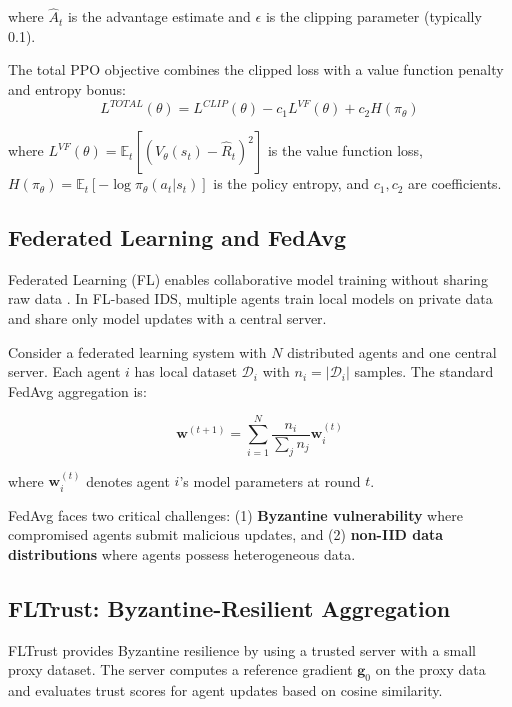 \documentclass[conference]{IEEEtran}
\begin{document}
where $\hat{A}_t$ is the advantage estimate and $\epsilon$ is the clipping parameter (typically 0.1).

The total PPO objective combines the clipped loss with a value function penalty and entropy bonus:
\begin{equation}
L^{TOTAL}(\theta) = L^{CLIP}(\theta) - c_1 L^{VF}(\theta) + c_2 H(\pi_\theta)
\end{equation}

where $L^{VF}(\theta) = \mathbb{E}_t[(V_\theta(s_t) - \hat{R}_t)^2]$ is the value function loss, $H(\pi_\theta) = \mathbb{E}_t[-\log \pi_\theta(a_t|s_t)]$ is the policy entropy, and $c_1, c_2$ are coefficients.

\subsection{Federated Learning and FedAvg}

Federated Learning (FL) enables collaborative model training without sharing raw data \cite{federated_avg}. In FL-based IDS, multiple agents train local models on private data and share only model updates with a central server.

Consider a federated learning system with $N$ distributed agents and one central server. Each agent $i$ has local dataset $\mathcal{D}_i$ with $n_i = |\mathcal{D}_i|$ samples. The standard FedAvg aggregation is:

\begin{equation}
\mathbf{w}^{(t+1)} = \sum_{i=1}^{N} \frac{n_i}{\sum_j n_j} \mathbf{w}_i^{(t)}
\end{equation}

where $\mathbf{w}_i^{(t)}$ denotes agent $i$'s model parameters at round $t$.

FedAvg faces two critical challenges: (1) \textbf{Byzantine vulnerability} where compromised agents submit malicious updates, and (2) \textbf{non-IID data distributions} where agents possess heterogeneous data.

\subsection{FLTrust: Byzantine-Resilient Aggregation}

FLTrust \cite{fltrust} provides Byzantine resilience by using a trusted server with a small proxy dataset. The server computes a reference gradient $\mathbf{g}_0$ on the proxy data and evaluates trust scores for agent updates based on cosine similarity.
\end{document}
